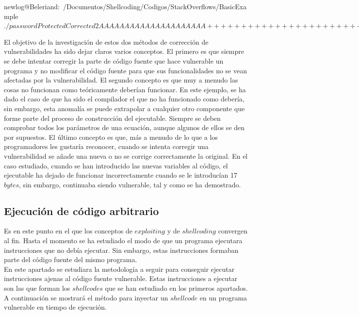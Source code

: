 \documentclass [titlepage, 12pt]{article}
\begin{document}
\begin{listing}[style=consola, numbers=none, caption=Vulnerabilidad corregida err\'oneamente]	
newlog@Beleriand:~/Documentos/Shellcoding/Codigos/StackOverflows/BasicExample$ ./passwordProtectedCorrected2 AAAAAAAAAAAAAAAAAAAAA

++++++++++++++++++++++++

|    ACCESS GRANTED    |

++++++++++++++++++++++++

newlog@Beleriand:~/Documentos/Shellcoding/Codigos/StackOverflows/BasicExample$  
\end{listing}

El objetivo de la investigaci\'on de estos dos m\'etodos de correcci\'on de vulnerabilidades ha sido dejar claros varios conceptos. El primero es que siempre se debe intentar corregir la parte de c\'odigo fuente que hace vulnerable un programa y no modificar el c\'odigo fuente para que sus funcionalidades no se vean afectadas por la vulnerabilidad. El segundo concepto es que muy a menudo las cosas no funcionan como te\'oricamente deber\'ian funcionar. En este ejemplo, se ha dado el caso de que ha sido el compilador el que no ha funcionado como deber\'ia, sin embargo, esta anomal\'ia se puede extrapolar a cualquier otro componente que forme parte del proceso de construcci\'on del ejecutable. Siempre se deben comprobar todos los par\'ametros de una ecuaci\'on, aunque algunos de ellos se den por supuestos. El \'ultimo concepto es que, m\'as a menudo de lo que a los programadores les gustar\'ia reconocer, cuando se intenta corregir una vulnerabilidad se a\~nade una nueva o no se corrige correctamente la original. En el caso estudiado, cuando se han introducido las nuevas variables al c\'odigo, el ejecutable ha dejado de funcionar incorrectamente cuando se le introduc\'ian 17 $bytes$, sin embargo, continuaba siendo vulnerable, tal y como se ha demostrado.

\pagebreak

\subsection {Ejecuci\'on de c\'odigo arbitrario}

\bigskip

Es en este punto en el que los conceptos de $exploiting$ y de $shellcoding$ convergen al fin. Hasta el momento se ha estudiado el modo de que un programa ejecutara instrucciones que no deb\'ia ejecutar. Sin embargo, estas instrucciones formaban parte del c\'odigo fuente del mismo programa. \\
En este apartado se estudiara la metodolog\'ia a seguir para conseguir ejecutar instrucciones ajenas al c\'odigo fuente vulnerable. Estas instrucciones a ejecutar son las que forman los $shellcodes$ que se han estudiado en los primeros apartados. \\
A continuaci\'on se mostrar\'a el m\'etodo para inyectar un $shellcode$ en un programa vulnerable en tiempo de ejecuci\'on.\bigskip
\end{document}
